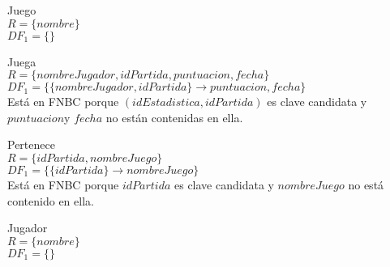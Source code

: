 \item{\large{Juego}} \\
$R = \{nombre \} $ \\
$DF_1 = \{\}$\\

\item{\large{Juega}} \\
$R = \{nombreJugador, idPartida, puntuacion,fecha \} $ \\
$DF_1 = \{ \{nombreJugador,idPartida \} \rightarrow puntuacion,fecha\}$ \\

Está en FNBC porque $(idEstadistica,idPartida)$ es clave candidata y $puntuacion$y $fecha$ no están contenidas en ella.

\item{\large{Pertenece}}\\
$R = \{idPartida,nombreJuego\} $\\
$DF_1 = \{ \{idPartida\} \rightarrow nombreJuego \}$\\
Está en FNBC porque $idPartida$ es clave candidata y $nombreJuego$ no está contenido en ella.

\item{\large{Jugador}}\\
$R = \{nombre\}$ \\
$ DF_1 = \{\} $ \\
